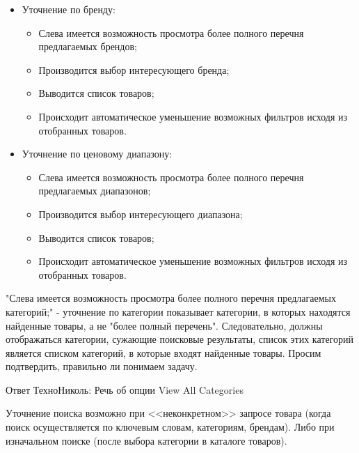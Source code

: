 {\begin{wikilong}
\begin{itemize}
		\item Уточнение по бренду:
		
			\begin{itemize}
				\item Слева имеется возможность просмотра более полного перечня предлагаемых брендов;
				\item Производится выбор интересующего бренда;
				\item Выводится список товаров;
				\item Происходит автоматическое уменьшение возможных фильтров исходя из отобранных товаров.
			\end{itemize}
		
		\item Уточнение по ценовому диапазону:
		
			\begin{itemize}
				\item Слева имеется возможность просмотра более полного перечня предлагаемых диапазонов;
				\item Производится выбор интересующего диапазона;
				\item Выводится список товаров;
				\item Происходит автоматическое уменьшение возможных фильтров исходя из отобранных товаров.
			\end{itemize}
	
	\end{itemize}
\end{wikilong}

\begin{teamidea}
"Слева имеется возможность просмотра более полного перечня предлагаемых категорий;" - уточнение по категории показывает категории, в которых находятся найденные товары, а не "более полный перечень". Следовательно, должны отображаться категории, сужающие поисковые результаты, список этих категорий является списком категорий, в которые входят найденные товары. Просим подтвердить, правильно ли понимаем задачу.

Ответ ТехноНиколь: Речь об опции View All Categories
\end{teamidea}



\begin{itogolong}
Уточнение поиска возможно при <<неконкретном>> запросе товара (когда поиск осуществляется по ключевым словам, категориям, брендам). Либо при изначальном поиске (после выбора категории в каталоге товаров).


\end{itogolong}}
